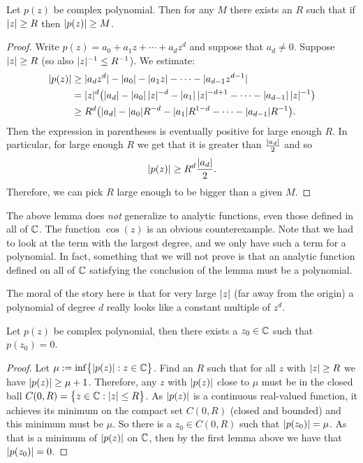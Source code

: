 \begin{lemma}
Let $p(z)$ be complex polynomial.  Then for any $M$ there exists
an $R$ such that if $\lvert {z} \rvert \geq R$ then $\lvert {p(z)} \rvert \geq M$.
\end{lemma}

\begin{proof}
Write $p(z) = a_0 + a_1 z + \cdots + a_d z^d$ and suppose that
$a_d \not= 0$.
Suppose $\lvert {z} \rvert \geq R$ (so also $\lvert {z} \rvert^{-1} \leq R^{-1}$).
We estimate:
\begin{equation*}
\begin{split}
\lvert {p(z)} \rvert
& \geq
\lvert {a_d z^d} \rvert -
\lvert {a_0} \rvert - \lvert {a_1 z} \rvert - \cdots - \lvert {a_{d-1} z^{d-1} } \rvert
\\
& =
\lvert {z} \rvert^d \bigl(
\lvert {a_d} \rvert -
\lvert {a_0} \rvert \, \lvert {z} \rvert^{-d} -
\lvert {a_1} \rvert \, \lvert {z} \rvert^{-d+1} - \cdots - \lvert {a_{d-1}} \rvert \, \lvert {z} \rvert^{-1}
\bigr)
\\
& \geq
R^d \bigl(\lvert {a_d} \rvert -
\lvert {a_0} \rvert R^{-d} - \lvert {a_1} \rvert R^{1-d} - \cdots - \lvert {a_{d-1}} \rvert R^{-1} \bigr)
.
\end{split}
\end{equation*}
Then the expression in parentheses is eventually positive for large enough
$R$.  In particular, for large enough $R$ we get that it is greater than
$\frac{\lvert {a_d} \rvert}{2}$ and so
\begin{equation*}
\lvert {p(z)} \rvert
\geq
R^d \frac{\lvert {a_d} \rvert}{2} .
\end{equation*}
Therefore,
we can pick $R$ large enough to be bigger than a given $M$.
\end{proof}

The above lemma does \emph{not} generalize to analytic
functions, even those defined in all of ${\mathbb{C}}$.  The function
$\cos(z)$ is an obvious counterexample.
Note that we had to look
at the term with the largest degree, and we only have such a term for
a polynomial.  In fact, something that we will not prove is that
an analytic function defined on all of ${\mathbb{C}}$ satisfying the conclusion
of the lemma must be a polynomial.

The moral of the story here is that for very large $\lvert {z} \rvert$ (far away from
the origin) a polynomial of degree $d$ really looks like a constant multiple
of $z^d$.

\begin{thm}
Let $p(z)$ be complex polynomial, then there exists a $z_0 \in {\mathbb{C}}$
such that $p(z_0) = 0$.
\end{thm}

\begin{proof}
Let $\mu := \inf \bigl\{ \lvert {p(z)} \rvert : z \in {\mathbb{C}} \bigr\}$.  Find an $R$ such that
for all $z$ with $\lvert {z} \rvert \geq R$ we have $\lvert {p(z)} \rvert \geq \mu+1$.
Therefore, any $z$ with $\lvert {p(z)} \rvert$ close to $\mu$ must be in the
closed ball $C(0,R) = \bigl\{ z \in {\mathbb{C}} : \lvert {z} \rvert \leq R \bigr\}$.  As $\lvert {p(z)} \rvert$
is a continuous real-valued function, it achieves its minimum
on the compact set $C(0,R)$ (closed and bounded) and this minimum must
be $\mu$.  So there is a $z_0 \in C(0,R)$ such that $\lvert {p(z_0)} \rvert = \mu$.
As that is a minimum of $\lvert {p(z)} \rvert$ on ${\mathbb{C}}$, then by the first lemma above we have
that $\lvert {p(z_0)} \rvert = 0$.
\end{proof}

